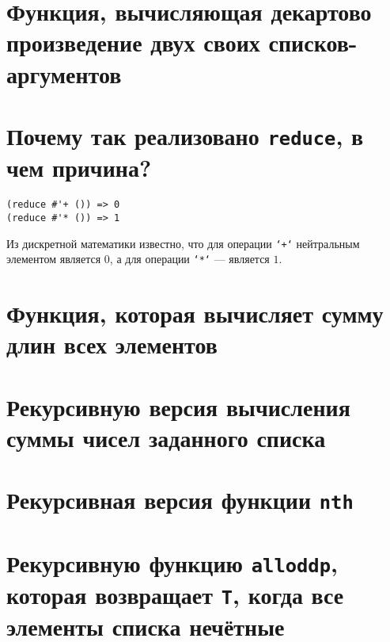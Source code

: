 \section{Функция, вычисляющая декартово произведение двух своих списков-аргументов}




\section{Почему так реализовано \texttt{reduce}, в чем причина?}

\begin{lstlisting}
(reduce #'+ ()) => 0
(reduce #'* ()) => 1
\end{lstlisting}

\noindent
Из дискретной математики известно, что для операции \texttt{`+`} нейтральным элементом является $0$, а для операции \texttt{`*`} --- является $1$.



\section{Функция, которая вычисляет сумму длин всех элементов}




\section{Рекурсивную версия вычисления суммы чисел заданного списка}




\section{Рекурсивная версия функции \texttt{nth}}




\section{Рекурсивную функцию  \texttt{alloddp}, которая возвращает \texttt{T}, когда все элементы списка нечётные}

